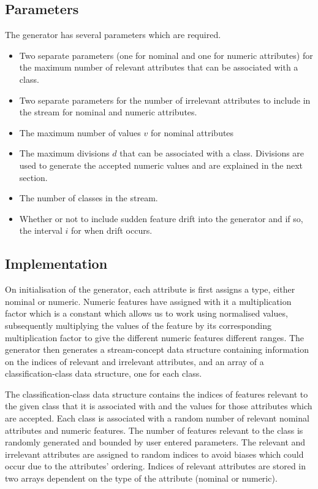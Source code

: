 \subsection{Parameters}
The generator has several parameters which are required.
\begin{itemize}
\item Two separate parameters (one for nominal and one for numeric attributes) for the maximum number of relevant attributes that can be associated with a class.
\item Two separate parameters for the number of irrelevant attributes to include in the stream for nominal and numeric attributes.
\item The maximum number of values $v$ for nominal attributes
\item The maximum divisions $d$ that can be associated with a class. Divisions are used to generate the accepted numeric values and are explained in the next section.
\item The number of classes in the stream.
\item Whether or not to include sudden feature drift into the generator and if so, the interval $i$ for when drift occurs.
\end{itemize}

\subsection{Implementation}
On initialisation of the generator, each attribute is first assigns a type, either nominal or numeric. Numeric features have assigned with it a multiplication factor which is a constant which allows us to work using normalised values, subsequently multiplying the values of the feature by its corresponding multiplication factor to give the different numeric features different ranges. The generator then generates a stream-concept data structure containing information on the indices of relevant and irrelevant attributes, and an array of a classification-class data structure, one for each class. 

The classification-class data structure contains the indices of features relevant to the given class that it is associated with and the values for those attributes which are accepted. Each class is associated with a random number of relevant nominal attributes and numeric features. The number of features relevant to the class is randomly generated and bounded by user entered parameters. The relevant and irrelevant attributes are assigned to random indices to avoid biases which could occur due to the attributes' ordering. Indices of relevant attributes are stored in two arrays dependent on the type of the attribute (nominal or numeric).

